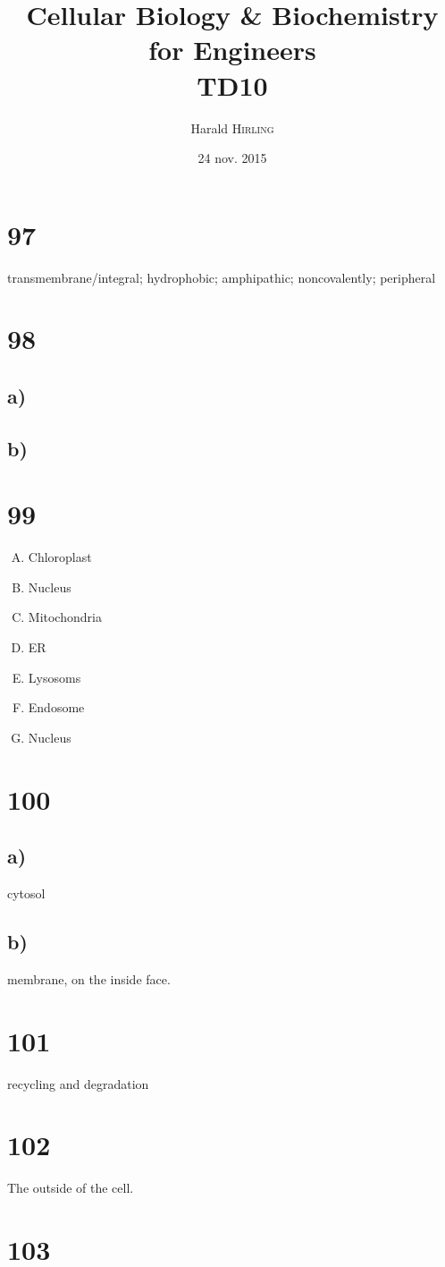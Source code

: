 

\title{Cellular Biology \& Biochemistry for Engineers\\TD10}
\author{Harald \textsc{Hirling}}
\date{24 nov. 2015}


\maketitle

\section*{97}
transmembrane/integral; hydrophobic; amphipathic; noncovalently; peripheral

\section*{98}
\subsection*{a)}


\subsection*{b)}

\section*{99}
\begin{enumerate}[A.]
    \item Chloroplast
    \item Nucleus
    \item Mitochondria
    \item ER
    \item Lysosoms
    \item Endosome
    \item Nucleus
\end{enumerate}

\section*{100}
\subsection*{a)}
cytosol

\subsection*{b)}
membrane, on the inside face.

\section*{101}
recycling and degradation

\section*{102}
The outside of the cell.

\section*{103}


